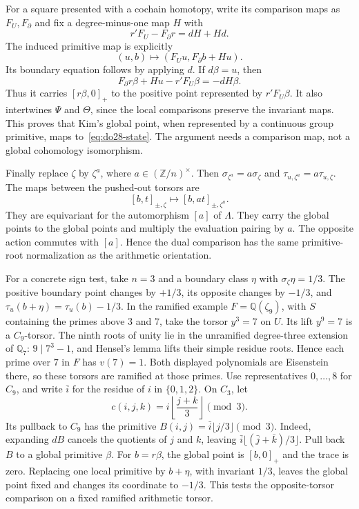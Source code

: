 For a square presented with a cochain homotopy, write its comparison
maps as \(F_U,F_\partial\) and fix a degree-minus-one map \(H\)
with
\[
 r'F_U-F_\partial r=dH+Hd.
\]
The induced primitive map is explicitly
\[
 (u,b)\longmapsto(F_Uu,F_\partial b+Hu).
\]
Its boundary equation follows by applying \(d\).
If \(d\beta=u\), then
\[
 F_\partial r\beta+Hu-r'F_U\beta=-dH\beta.
\]
Thus it carries \([r\beta,0]_+\) to the positive point represented
by \(r'F_U\beta\). It also intertwines \(\Psi\) and \(\Theta\),
since the local comparisons preserve the invariant maps.
This proves that Kim's global point, when represented by a continuous
group primitive, maps to~\eqref{eq:do28-state}. The argument needs
a comparison map, not a global cohomology isomorphism.

Finally replace \(\zeta\) by \(\zeta^a\), where
\(a\in(\mathbb Z/n)^\times\). Then
\(\sigma_{\zeta^a}=a\sigma_\zeta\) and
\(\tau_{u,\zeta^a}=a\tau_{u,\zeta}\).
The maps between the pushed-out torsors are
\[
 [b,t]_{\pm,\zeta}\longmapsto[b,at]_{\pm,\zeta^a}.
\]
They are equivariant for the automorphism \([a]\) of \(\Lambda\).
They carry the global points to the global points and multiply the
evaluation pairing by \(a\). The opposite action commutes with
\([a]\). Hence the dual comparison has the same primitive-root
normalization as the arithmetic orientation.

For a concrete sign test, take \(n=3\) and a boundary class \(\eta\)
with \(\sigma_\zeta\eta=1/3\). The positive boundary point changes
by \(+1/3\), its opposite changes by \(-1/3\), and
\(\tau_u(b+\eta)=\tau_u(b)-1/3\).
In the ramified example \(F=\mathbb Q(\zeta_9)\), with \(S\)
containing the primes above \(3\) and \(7\), take the torsor
\(y^3=7\) on \(U\). Its lift \(y^9=7\) is a \(C_9\)-torsor.
The ninth roots of unity lie in the unramified degree-three extension
of \(\mathbb Q_7\): \(9\mid7^3-1\), and Hensel's lemma lifts
their simple residue roots. Hence each prime over \(7\) in \(F\)
has \(v(7)=1\). Both displayed polynomials are Eisenstein there,
so these torsors are ramified at those primes. Use representatives
\(0,\ldots,8\) for \(C_9\), and write \(\bar i\) for the
residue of \(i\) in \(\{0,1,2\}\). On \(C_3\), let
\[
 c(i,j,k)=i\left\lfloor\frac{j+k}{3}\right\rfloor\pmod3.
\]
Its pullback to \(C_9\) has the primitive
\(B(i,j)=\bar i\lfloor j/3\rfloor\pmod3\).
Indeed, expanding \(dB\) cancels the quotients of \(j\) and \(k\),
leaving \(\bar i\lfloor(\bar j+\bar k)/3\rfloor\).
Pull back \(B\) to a global primitive \(\beta\).
For \(b=r\beta\), the global point is \([b,0]_+\) and the trace
is zero. Replacing one local primitive by \(b+\eta\), with invariant
\(1/3\), leaves the global point fixed and changes its coordinate
to \(-1/3\). This tests the opposite-torsor comparison on a fixed
ramified arithmetic torsor.

